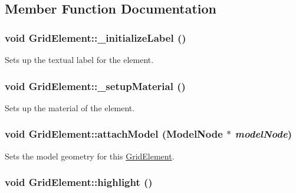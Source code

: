 \subsection{Member Function Documentation}
\hypertarget{class_grid_element_af853d66404412c70cd56c39969ab2564}{
\subsubsection[{\_\-initializeLabel}]{\setlength{\rightskip}{0pt plus 5cm}void GridElement::\_\-initializeLabel ()}}
\label{class_grid_element_af853d66404412c70cd56c39969ab2564}
Sets up the textual label for the element. \hypertarget{class_grid_element_ab9c419150dfaca5b2947da452edd558e}{
\subsubsection[{\_\-setupMaterial}]{\setlength{\rightskip}{0pt plus 5cm}void GridElement::\_\-setupMaterial ()}}
\label{class_grid_element_ab9c419150dfaca5b2947da452edd558e}
Sets up the material of the element. \hypertarget{class_grid_element_aaebf902834ef49b534433d7385fc398d}{
\subsubsection[{attachModel}]{\setlength{\rightskip}{0pt plus 5cm}void GridElement::attachModel (ModelNode $\ast$ {\em modelNode})}}
\label{class_grid_element_aaebf902834ef49b534433d7385fc398d}
Sets the model geometry for this \hyperlink{class_grid_element}{GridElement}. \hypertarget{class_grid_element_ab75d977fe8ea590a8fbf89d39beb3adb}{
\subsubsection[{highlight}]{\setlength{\rightskip}{0pt plus 5cm}void GridElement::highlight ()}}
